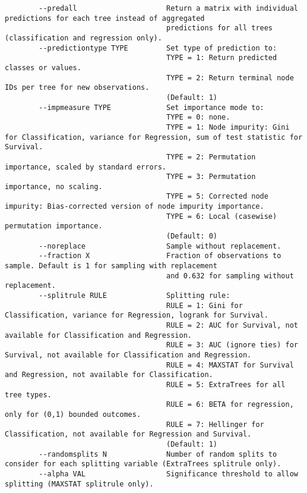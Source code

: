 \documentclass[12pt,oneside]{book}
\begin{document}
\begin{lstlisting}
        --predall                     Return a matrix with individual predictions for each tree instead of aggregated 
                                      predictions for all trees (classification and regression only).
        --predictiontype TYPE         Set type of prediction to:
                                      TYPE = 1: Return predicted classes or values.
                                      TYPE = 2: Return terminal node IDs per tree for new observations.
                                      (Default: 1)
        --impmeasure TYPE             Set importance mode to:
                                      TYPE = 0: none.
                                      TYPE = 1: Node impurity: Gini for Classification, variance for Regression, sum of test statistic for Survival.
                                      TYPE = 2: Permutation importance, scaled by standard errors.
                                      TYPE = 3: Permutation importance, no scaling.
                                      TYPE = 5: Corrected node impurity: Bias-corrected version of node impurity importance.
                                      TYPE = 6: Local (casewise) permutation importance.
                                      (Default: 0)
        --noreplace                   Sample without replacement.
        --fraction X                  Fraction of observations to sample. Default is 1 for sampling with replacement 
                                      and 0.632 for sampling without replacement.
        --splitrule RULE              Splitting rule:
                                      RULE = 1: Gini for Classification, variance for Regression, logrank for Survival.
                                      RULE = 2: AUC for Survival, not available for Classification and Regression.
                                      RULE = 3: AUC (ignore ties) for Survival, not available for Classification and Regression.
                                      RULE = 4: MAXSTAT for Survival and Regression, not available for Classification.
                                      RULE = 5: ExtraTrees for all tree types.
                                      RULE = 6: BETA for regression, only for (0,1) bounded outcomes.
                                      RULE = 7: Hellinger for Classification, not available for Regression and Survival.
                                      (Default: 1)
        --randomsplits N              Number of random splits to consider for each splitting variable (ExtraTrees splitrule only).
        --alpha VAL                   Significance threshold to allow splitting (MAXSTAT splitrule only).

\end{lstlisting}
\end{document}

